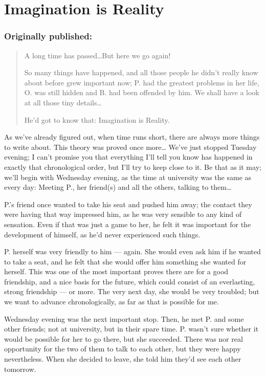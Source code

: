 \chapter{Imagination is Reality}
\label{cha:imagination-is-reality}
\subsection*{Originally published: }
\begin{quote}
A long time has passed\ldots But here we go again!

So many things have happened, and all those people he didn't really know about before grew important now; P. had the greatest problems in her life, O. was still hidden and B. had been offended by him. We shall have a look at all those tiny details\ldots

He'd got to know that: Imagination is Reality.
\end{quote}

As we've already figured out, when time runs short, there are always more things to write about. This theory was proved once more\ldots
We've just stopped Tuesday evening; I can't promise you that everything I'll tell you know has happened in exactly that chronological order, but I'll try to keep close to it. 
Be that as it may; we'll begin with Wednesday evening, as the time at university was the same as every day: Meeting P., her friend(s) and all the others, talking to them\ldots

P.'s friend once wanted to take his seat and pushed him away; the contact they were having that way impressed him, as he was very sensible to any kind of sensation. Even if that was just a game to her, he felt it was important for the development of himself, as he'd never experienced such things.

P. herself was very friendly to him --- again. She would even ask him if he wanted to take a seat, and he felt that she would offer him something she wanted for herself. This was one of the most important proves there are for a good friendship, and a nice basis for the future, which could consist of an everlasting, strong friendship --- or more. The very next day, she would be very troubled; but we want to advance chronologically, as far as that is possible for me.

Wednesday evening was the next important stop. Then, he met P. and some other friends; not at university, but in their spare time. P. wasn't sure whether it would be possible for her to go there, but she succeeded. There was nor real opportunity for the two of them to talk to each other, but they were happy nevertheless. When she decided to leave, she told him they'd see each other tomorrow.

